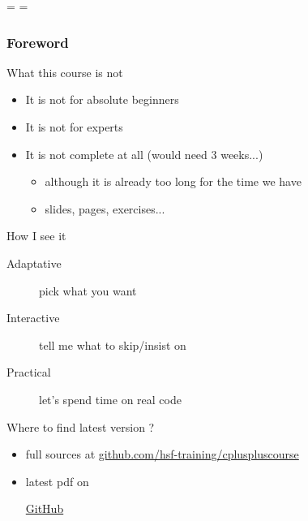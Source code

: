 \documentclass[compress]{beamer}
\newif\ifbasic
\begin{document}
\showboxdepth=\maxdimen
\showboxbreadth=\maxdimen

\begin{frame}
  \titlepage
\end{frame}

\begin{frame}
  \frametitle{Foreword}
  \begin{block}{What this course is not}
    \begin{itemize}
    \item It is not for absolute beginners
    \item It is not for experts
    \item It is not complete at all (would need 3 weeks...)
      \begin{itemize}
      \item although it is already too long for the time we have
      \item \inserttotalframenumber{} slides, \insertpresentationendpage{} pages,  exercises...
      \end{itemize}
    \end{itemize}
  \end{block}
  \begin{block}{How I see it}
    \begin{description}
    \item[Adaptative] pick what you want
    \item[Interactive] tell me what to skip/insist on
    \item[Practical] let's spend time on real code
    \end{description}
  \end{block}
  \begin{block}{Where to find latest version ?}
    \begin{itemize}
    \item full sources at \href{https://github.com/hsf-training/cpluspluscourse}{github.com/hsf-training/cpluspluscourse}
    \item latest pdf on
    \ifbasic
      \href{https://github.com/hsf-training/cpluspluscourse/raw/download/talk/C++Course\_essentials.pdf}{GitHub}
    \else
      \href{https://github.com/hsf-training/cpluspluscourse/raw/download/talk/C++Course\_full.pdf}{GitHub}
    \fi
    \end{itemize}
  \end{block}
\end{frame}
\end{document}
